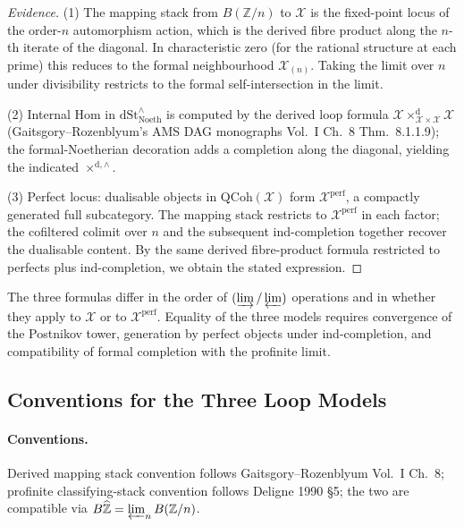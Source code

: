 \begin{proof}[Evidence]
(1) The mapping stack from \(B(\mathbb{Z}/n)\) to \(\mathcal{X}\) is
the fixed-point locus of the order-\(n\) automorphism action, which
is the derived fibre product along the \(n\)-th iterate of the
diagonal. In characteristic zero (for the rational structure at
each prime) this reduces to the formal neighbourhood
\(\mathcal{X}_{(n)}\). Taking the limit over \(n\) under divisibility
restricts to the formal self-intersection in the limit.

(2) Internal Hom in \(\mathrm{dSt}^{\wedge}_{\mathrm{Noeth}}\) is
computed by the derived loop formula
\(\mathcal{X}\times^{\mathrm{d}}_{\mathcal{X}\times\mathcal{X}}\mathcal{X}\)
(Gaitsgory--Rozenblyum's AMS DAG monographs Vol.~I Ch.~8
Thm.~8.1.1.9); the formal-Noetherian decoration adds a
completion along the diagonal, yielding the indicated
\(\times^{\mathrm{d},\wedge}\).

(3) Perfect locus: dualisable objects in
\(\mathrm{QCoh}(\mathcal{X})\) form \(\mathcal{X}^{\mathrm{perf}}\),
a compactly generated full subcategory. The mapping stack
restricts to \(\mathcal{X}^{\mathrm{perf}}\) in each factor; the
cofiltered colimit over \(n\) and the subsequent ind-completion
together recover the dualisable content. By the same derived
fibre-product formula restricted to perfects plus ind-completion,
we obtain the stated expression.
\end{proof}

\begin{remark}
\label{v4-arith:bzn-rcompletion:rem:three-formulas}
The three formulas differ in the order of \((\varinjlim/\varprojlim)\)
operations and in whether they apply to \(\mathcal{X}\) or to
\(\mathcal{X}^{\mathrm{perf}}\). Equality of the three models
requires convergence of the Postnikov tower, generation by perfect
objects under ind-completion, and compatibility of formal completion
with the profinite limit.
\end{remark}

\subsection{Conventions for the Three Loop Models}

\paragraph{Conventions.} Derived mapping stack
convention follows Gaitsgory--Rozenblyum Vol.~I Ch.~8; profinite
classifying-stack convention follows Deligne 1990 \S 5; the two are
compatible via
\(B\widehat{\mathbb{Z}}=\varprojlim_{n}B(\mathbb{Z}/n)\).

